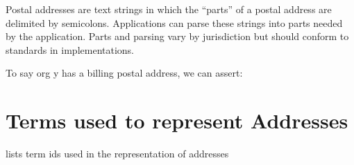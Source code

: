 \documentclass[letterpaper,10pt,english]{sphinxmanual}
\begin{document}
\sphinxAtStartPar
Postal addresses are text strings in which the “parts” of a postal address are
delimited by semicolons. Applications can parse these strings into parts needed
by the application. Parts and parsing vary by jurisdiction but should conform to
 standards in implementations.

\sphinxAtStartPar
To say org y has a billing postal address, we can assert:

\begin{sphinxVerbatim}[commandchars=\\\{\}]
  
  
  
  
  
\end{sphinxVerbatim}


\section{Terms used to represent Addresses}
\label{\detokenize{addresses:terms-used-to-represent-addresses}}
\sphinxAtStartPar
{\hyperref[\detokenize{addresses:table-11}]{}} lists term ids used in the representation of addresses
\end{document}
